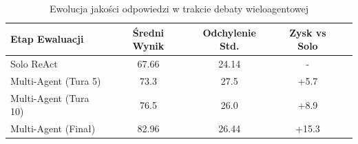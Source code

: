 \begin{table}[htbp]
\centering
\caption{Ewolucja jakości odpowiedzi w trakcie debaty wieloagentowej}
\label{tab:ewolucja_debaty}
\begin{tabular}{lcccc}
\hline
\textbf{Etap Ewaluacji} & \textbf{Średni Wynik} & \textbf{Odchylenie Std.} & \textbf{Zysk vs Solo} \\
\hline
Solo ReAct & 67.66 & 24.14 & - \\
Multi-Agent (Tura 5) & 73.3 & 27.5 & +5.7 \\
Multi-Agent (Tura 10) & 76.5 & 26.0 & +8.9 \\
Multi-Agent (Finał) & 82.96 & 26.44 & +15.3 \\
\hline
\end{tabular}
\end{table}
